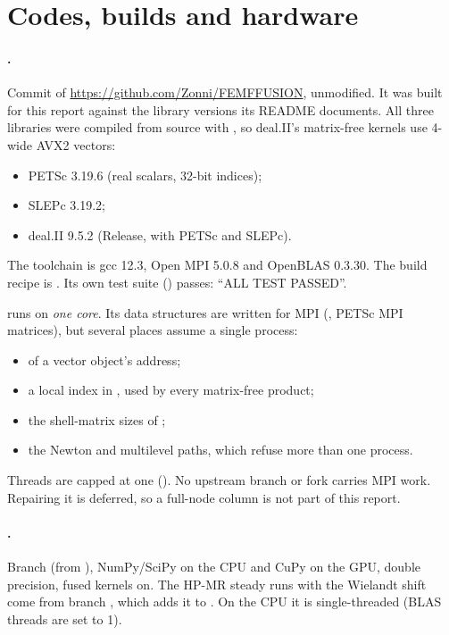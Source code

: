 \section{Codes, builds and hardware}
\label{sec:codes}

\paragraph{\ffn{}.} Commit  of
\url{https://github.com/Zonni/FEMFFUSION}, unmodified. It was built for this
report against the library versions its README documents. All three
libraries were compiled from source with , so
deal.II's matrix-free kernels use 4-wide AVX2 vectors:
\begin{itemize}
\item PETSc 3.19.6 (real scalars, 32-bit indices);
\item SLEPc 3.19.2;
\item deal.II 9.5.2 (Release, with PETSc and SLEPc).
\end{itemize}
The toolchain is gcc 12.3, Open MPI 5.0.8 and OpenBLAS 0.3.30. The build
recipe is . Its own test suite
() passes: ``ALL TEST PASSED''.

\ffn{} runs on \emph{one core}. Its data structures are written for MPI
(, PETSc MPI matrices), but several
places assume a single process:
\begin{itemize}
\item {} of a vector object's address;
\item a local index in , used by every matrix-free product;
\item the shell-matrix sizes of ;
\item the Newton and multilevel paths, which refuse more than one process.
\end{itemize}
Threads are capped at one (). No upstream
branch or fork carries MPI work. Repairing it is deferred, so a full-node
\ffn{} column is not part of this report.

\paragraph{\garnet{}.} Branch  (from
), NumPy/SciPy on the CPU and CuPy on the GPU, double
precision, fused kernels on. The HP-MR steady runs with the Wielandt shift
come from branch , which adds it to
. On the CPU it is single-threaded (BLAS threads
are set to 1).

